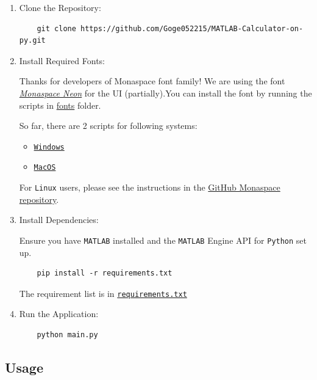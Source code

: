 \documentclass{article}
\begin{document}
\begin{enumerate}
\def\labelenumi{\arabic{enumi}.}
\item Clone the Repository:

\begin{verbatim}
    git clone https://github.com/Goge052215/MATLAB-Calculator-on-py.git
\end{verbatim}

\item Install Required Fonts:

  Thanks for developers of Monaspace font family! We are using the font
  \href{https://monaspace.githubnext.com/}{\textit{Monaspace Neon}} for
  the UI (partially).You can install the font by running the scripts in
  \url{fonts} folder.

  So far, there are 2 scripts for following systems:

  \begin{itemize}
  \item \href{https://github.com/Goge052215/MATLAB-Calculator-on-py/blob/master/fonts/fonts_download.ps1}{\texttt{Windows}}
  \item \href{https://github.com/Goge052215/MATLAB-Calculator-on-py/blob/master/fonts/fonts_download.bash}{\texttt{MacOS}}
  \end{itemize}

  \noindent For \texttt{Linux} users, please see the instructions in the
  \href{https://github.com/githubnext/monaspace?tab=readme-ov-file}{GitHub
  Monaspace repository}.

\item Install Dependencies:

  \noindent Ensure you have \texttt{MATLAB} installed and the \texttt{MATLAB} Engine API for \texttt{Python}
  set up.

\begin{verbatim}
    pip install -r requirements.txt
\end{verbatim}

  \noindent The requirement list is in \href{https://github.com/Goge052215/MATLAB-Calculator-on-py/blob/master/requirements.txt}{\texttt{requirements.txt}}

\item Run the Application:

\begin{verbatim}
    python main.py
\end{verbatim}
\end{enumerate}

\subsection{Usage}
\end{document}
